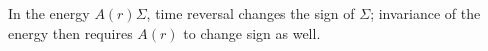 In the energy $A(r)\Sigma$, time reversal changes the sign of $\Sigma$; invariance of the energy then requires $A(r)$ to change sign as well.
